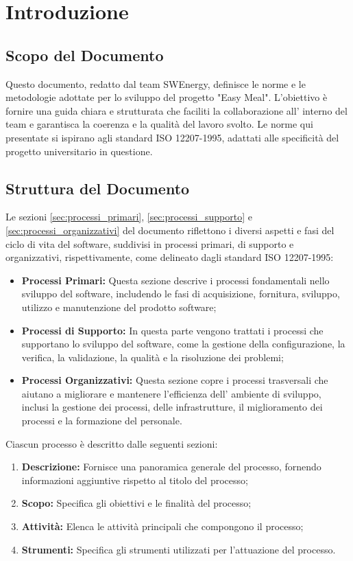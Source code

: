 \section{Introduzione}

\subsection{Scopo del Documento}
Questo documento, redatto dal team SWEnergy, definisce le norme e le
metodologie adottate per lo sviluppo del progetto "Easy Meal". L'obiettivo è
fornire una guida chiara e strutturata che faciliti la collaborazione all'
interno del team e garantisca la coerenza e la qualità del lavoro svolto. Le
norme qui presentate si ispirano agli standard ISO 12207-1995, adattati alle
specificità del progetto universitario in questione.

\subsection{Struttura del Documento}
Le sezioni \autoref{sec:processi_primari}, \autoref{sec:processi_supporto}
e \autoref{sec:processi_organizzativi} del documento
riflettono i diversi aspetti e fasi del ciclo di vita del software, suddivisi in
processi primari, di supporto e organizzativi, rispettivamente, come delineato
dagli standard ISO 12207-1995:

\begin{itemize}
	\item \textbf{Processi Primari:} Questa sezione descrive i processi
	      fondamentali nello sviluppo del software, includendo le fasi di
	      acquisizione, fornitura, sviluppo, utilizzo e manutenzione del
	      prodotto software;
	\item \textbf{Processi di Supporto:} In questa parte vengono trattati i
	      processi che supportano lo sviluppo del software, come la gestione
	      della configurazione, la verifica, la validazione, la qualità e la
	      risoluzione dei problemi;
	\item \textbf{Processi Organizzativi:} Questa sezione copre i processi
	      trasversali che aiutano a migliorare e mantenere l'efficienza dell'
	      ambiente di sviluppo, inclusi la gestione dei processi, delle
	      infrastrutture, il miglioramento dei processi e la formazione del
	      personale.
\end{itemize}

Ciascun processo è descritto dalle seguenti sezioni:
\begin{enumerate}
	\item \textbf{Descrizione:} Fornisce una panoramica generale del processo,
	      fornendo informazioni aggiuntive rispetto al titolo del processo;
	\item \textbf{Scopo:} Specifica gli obiettivi e le finalità del processo;
	\item \textbf{Attività:} Elenca le attività principali che compongono il
	      processo;
	\item \textbf{Strumenti:} Specifica gli strumenti utilizzati per
	      l'attuazione del processo.
\end{enumerate}

